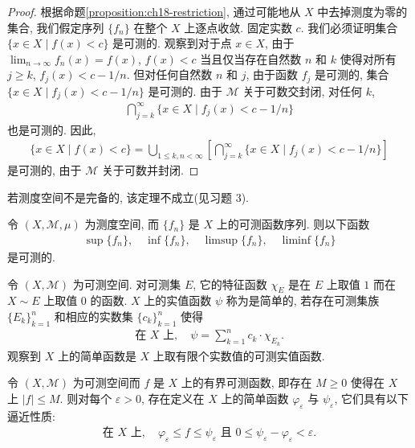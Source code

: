 \documentclass[../../main.tex]{subfiles}
\begin{document}
\begin{proof}
根据命题\cref{proposition:ch18-restriction}, 通过可能地从 $X$ 中去掉测度为零的集合, 我们假定序列 $\{f_{n}\}$ 在整个 $X$ 上逐点收敛. 固定实数 $c$. 我们必须证明集合 $\{x\in X\mid f(x)<c\}$ 是可测的. 观察到对于点 $x\in X$, 由于 $\lim_{n\to\infty}f_{n}(x)=f(x)$, $f(x)<c$ 当且仅当存在自然数 $n$ 和 $k$ 使得对所有 $j\geqslant k$, $f_{j}(x)<c-1/n$. 但对任何自然数 $n$ 和 $j$, 由于函数 $f_{j}$ 是可测的, 集合 $\{x\in X\mid f_{j}(x)<c-1/n\}$ 是可测的. 由于 $\mathcal{M}$ 关于可数交封闭, 对任何 $k$,
\begin{align*}
\bigcap_{j=k}^{\infty}\{x\in X\mid f_{j}(x)<c-1/n\}
\end{align*}
也是可测的. 因此,
\begin{align*}
\{x\in X\mid f(x)<c\}=\bigcup_{1\leqslant k,n<\infty}\left[\bigcap_{j=k}^{\infty}\{x\in X\mid f_{j}(x)<c-1/n\}\right]
\end{align*}
是可测的, 由于 $\mathcal{M}$ 关于可数并封闭.
\end{proof}

若测度空间不是完备的, 该定理不成立(见习题 3).

\begin{corollary}\label{corollary:ch18-limsup-measurable}
令 $(X,\mathcal{M},\mu)$ 为测度空间, 而 $\{f_{n}\}$ 是 $X$ 上的可测函数序列. 则以下函数
\begin{align*}
\sup\{f_{n}\},\quad\inf\{f_{n}\},\quad\limsup\{f_{n}\},\quad\liminf\{f_{n}\}
\end{align*}
是可测的.
\end{corollary}

\begin{definition}[简单函数]\label{definition:ch18-simple-function}
令 $(X,\mathcal{M})$ 为可测空间. 对可测集 $E$, 它的特征函数 $\chi_{E}$ 是在 $E$ 上取值 $1$ 而在 $X\sim E$ 上取值 $0$ 的函数. $X$ 上的实值函数 $\psi$ 称为是简单的, 若存在可测集族 $\{E_{k}\}_{k=1}^{n}$ 和相应的实数集 $\{c_{k}\}_{k=1}^{n}$ 使得
\begin{align*}
\text{在 }X\text{ 上},\quad\psi=\sum_{k=1}^{n}c_{k}\cdot\chi_{E_{k}}.
\end{align*}
观察到 $X$ 上的简单函数是 $X$ 上取有限个实数值的可测实值函数.
\end{definition}

\begin{lemma}[简单逼近引理]\label{lemma:ch18-simple-approximation}
令 $(X,\mathcal{M})$ 为可测空间而 $f$ 是 $X$ 上的有界可测函数, 即存在 $M\geqslant 0$ 使得在 $X$ 上 $|f|\leqslant M$. 则对每个 $\varepsilon>0$, 存在定义在 $X$ 上的简单函数 $\varphi_{\varepsilon}$ 与 $\psi_{\varepsilon}$, 它们具有以下逼近性质:
\begin{align*}
\text{在 }X\text{ 上},\quad\varphi_{\varepsilon}\leqslant f\leqslant\psi_{\varepsilon}\text{ 且 }0\leqslant\psi_{\varepsilon}-\varphi_{\varepsilon}<\varepsilon.
\end{align*}
\end{lemma}
\end{document}
